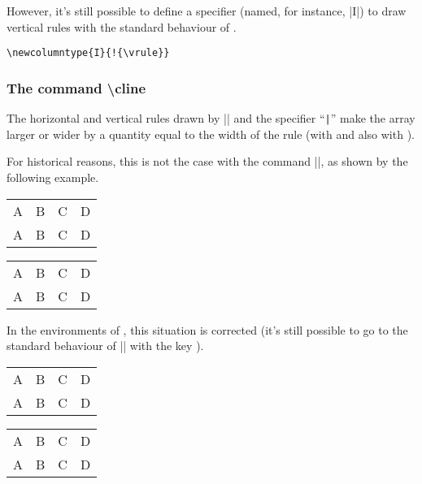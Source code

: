 \documentclass[dvipsnames]{article}%
\begin{document}
\bigskip
However, it's still possible to define a specifier (named, for instance, |I|)
to draw vertical rules with the standard behaviour of .

\begin{Verbatim}
\newcolumntype{I}{!{\vrule}}
\end{Verbatim}


\bigskip
\subsubsection{The command \textbackslash cline}

\label{remark-cline}

The horizontal and vertical rules drawn by |\hline| and the specifier
``\verb+|+'' make the array larger or wider by a quantity equal to the width
of the rule (with  and also with ).

\smallskip
For historical reasons, this is not the case with the command |\cline|, as
shown by the following example.

\medskip
\begin{Code}[width=10cm]
\setlength{\arrayrulewidth}{2pt}
\begin{tabular}{cccc} \hline
A&B&C&D \\ \emph{\cline{2-2}}
A&B&C&D \\ \hline
\end{tabular}
\end{Code}
\begin{scope}
\setlength{\arrayrulewidth}{2pt}
\begin{tabular}[c]{cccc}
\hline
A&B&C&D \\
\cline{2-2}
A&B&C&D \\
\hline
\end{tabular}
\end{scope}

\medskip
{}
In the environments of , this situation is corrected (it's
still possible to go to the standard behaviour of |\cline| with the key
). 

\medskip
\begin{Code}[width=10cm]
\setlength{\arrayrulewidth}{2pt}
\begin{NiceTabular}{cccc} \hline
A&B&C&D \\ \emph{}
A&B&C&D \\ \hline
\end{NiceTabular}
\end{Code}
\begin{scope}
\setlength{\arrayrulewidth}{2pt}
\begin{NiceTabular}[c]{cccc}
\hline
A&B&C&D \\ 
A&B&C&D \\ \hline
\end{NiceTabular}
\end{scope}
\end{document}
